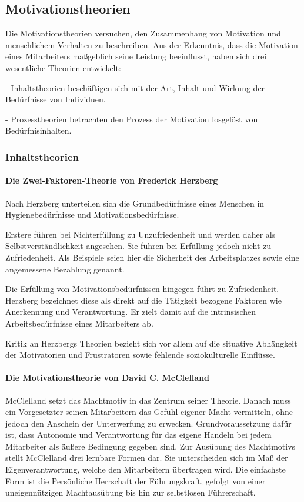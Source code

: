 \subsection{Motivationstheorien}
Die Motivationstheorien versuchen, den Zusammenhang von Motivation und menschlichem Verhalten zu beschreiben. Aus der Erkenntnis, dass die Motivation eines Mitarbeiters maßgeblich seine Leistung beeinflusst, haben sich drei wesentliche Theorien entwickelt:

- Inhaltstheorien beschäftigen sich mit \glqq der Art, Inhalt und Wirkung der Bedürfnisse von Individuen\grqq. \citep[S. 391]{Drumm.2008}

- Prozesstheorien betrachten den Prozess der Motivation losgelöst von Bedürfnisinhalten. \citep[S. 391]{Drumm.2008}

\newpage
\subsubsection{Inhaltstheorien}
\paragraph{Die Zwei-Faktoren-Theorie von Frederick Herzberg}
Nach Herzberg unterteilen sich die Grundbedürfnisse eines Menschen in Hygienebedürfnisse und  Motivationsbedürfnisse.

Erstere führen bei Nichterfüllung zu Unzufriedenheit und werden daher als Selbstverständlichkeit angesehen. Sie führen bei Erfüllung jedoch nicht zu Zufriedenheit. Als Beispiele seien hier die Sicherheit des Arbeitsplatzes sowie eine angemessene Bezahlung genannt. \citep[S. 26]{Nowka.2013}

Die Erfüllung von Motivationsbedürfnissen hingegen führt zu Zufriedenheit. Herzberg bezeichnet diese als direkt auf die Tätigkeit bezogene Faktoren wie Anerkennung und Verantwortung. Er zielt damit auf die intrinsischen Arbeitsbedürfnisse eines Mitarbeiters ab. \citep[S. 26f]{Nowka.2013}

Kritik an Herzbergs Theorien bezieht sich vor allem auf die situative Abhängkeit der Motivatorien und Frustratoren sowie fehlende soziokulturelle Einflüsse. \citep[S. 396]{Drumm.2008}

\paragraph{Die Motivationstheorie von David C. McClelland}
McClelland setzt das Machtmotiv in das Zentrum seiner Theorie. Danach muss ein Vorgesetzter seinen Mitarbeitern das Gefühl eigener Macht vermitteln, ohne jedoch den Anschein der Unterwerfung zu erwecken. Grundvoraussetzung dafür ist, dass Autonomie und Verantwortung für das eigene Handeln bei jedem Mitarbeiter als äußere Bedingung gegeben sind. 
Zur Ausübung des Machtmotivs stellt McClelland drei lernbare Formen dar. Sie unterscheiden sich im Maß der Eigenverantwortung, welche den Mitarbeitern übertragen wird. Die einfachste Form ist die Persönliche Herrschaft der Führungskraft, gefolgt von einer uneigennützigen Machtausübung bis hin zur selbstlosen Führerschaft. \citep[S. 396ff]{Drumm.2008}

